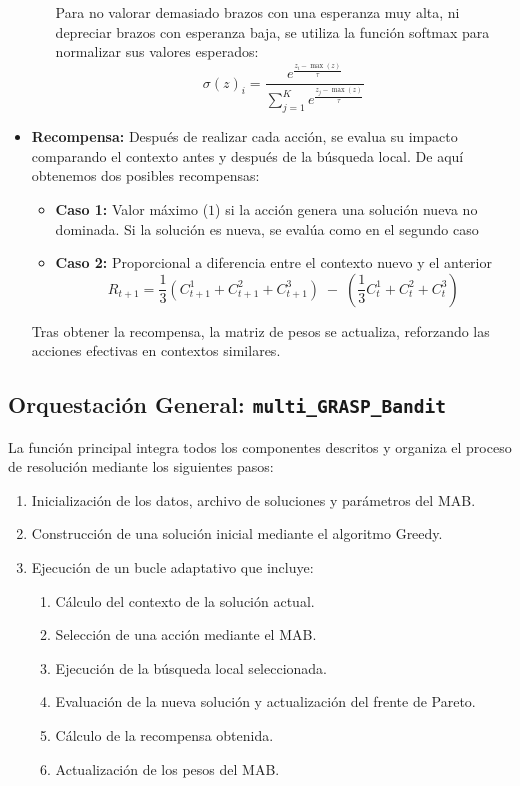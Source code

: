 \documentclass[12pt,a4paper]{book}
\begin{document}
\begin{itemize}
\begin{itemize}
        Para no valorar demasiado brazos con una esperanza muy alta, ni depreciar brazos con esperanza baja, se utiliza la función softmax para normalizar sus valores esperados:
\begin{equation}
    \sigma(z)_i = \frac{e^{\frac{z_i - \max(z)}{\tau}}}{\sum_{j=1}^{K} e^{\frac{z_j - \max(z)}{\tau}}}
\end{equation}
    \end{itemize}

    \item \textbf{Recompensa:} Después de realizar cada acción, se evalua su impacto comparando el contexto antes y después de la búsqueda local. De aquí obtenemos dos posibles recompensas:
        \begin{itemize}
        \item \textbf{Caso 1:} Valor máximo ($1$) si la acción genera una solución nueva no dominada. Si la solución es nueva, se evalúa como en el segundo caso
        \item \textbf{Caso 2:} Proporcional a diferencia entre el contexto nuevo y el anterior
        $$R_{t+1}=\frac{1}{3}(C_{t+1}^1+C_{t+1}^2+C_{t+1}^3) \; - \; (\frac{1}{3}C_t^1+C_t^2+C_t^3)$$
    \end{itemize}

    Tras obtener la recompensa, la matriz de pesos se actualiza, reforzando las acciones efectivas en contextos similares.
\end{itemize}

\subsection{Orquestación General: \texttt{multi\_GRASP\_Bandit}}
La función principal integra todos los componentes descritos y organiza el proceso de resolución mediante los siguientes pasos:  

\begin{enumerate}
    \item Inicialización de los datos, archivo de soluciones y parámetros del MAB.
    \item Construcción de una solución inicial mediante el algoritmo Greedy.
    \item Ejecución de un bucle adaptativo que incluye:
    \begin{enumerate}
        \item Cálculo del contexto de la solución actual.
        \item Selección de una acción mediante el MAB.
        \item Ejecución de la búsqueda local seleccionada.
        \item Evaluación de la nueva solución y actualización del frente de Pareto.
        \item Cálculo de la recompensa obtenida.
        \item Actualización de los pesos del MAB.
    \end{enumerate}
\end{enumerate}
\end{document}
